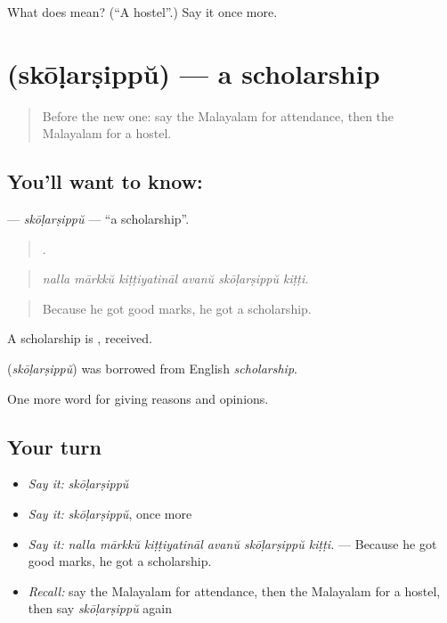 \begin{tcolorbox}[breakable,colback=teal!4,colframe=teal!35!black,title={Before you move on}]
What does  mean? (\textquotedblleft{}A hostel\textquotedblright{}.) Say it once more.
\end{tcolorbox}
\section[\texorpdfstring{\ml{സ്കോളർഷിപ്പ്} (skōḷarṣippŭ)}{സ്കോളർഷിപ്പ് (skōḷarṣippŭ)}]{ (skōḷarṣippŭ) — a scholarship}

\label{lesson:ML-C434-skolarsippu}



\begin{quote}
Before the new one: say the Malayalam for attendance, then the Malayalam for a hostel.
\end{quote}

\subsection*{You'll want to know: }
\textbf{} — \emph{skōḷarṣippŭ} — \textquotedblleft{}a scholarship\textquotedblright{}.

\begin{quote}
     .
\end{quote}

\begin{quote}
\emph{nalla mārkkŭ kiṭṭiyatināl avanŭ skōḷarṣippŭ kiṭṭi.}
\end{quote}

\begin{quote}
Because he got good marks, he got a scholarship.
\end{quote}

A scholarship is , received.

\begin{cousinweb}
\textbf{} (\emph{skōḷarṣippŭ}) was borrowed from English \emph{scholarship}.
\end{cousinweb}

\begin{grammarlens}[title={What you've built}]
One more word for giving reasons and opinions.
\end{grammarlens}

\subsection*{Your turn}
\begin{itemize}
\raggedright
  \item \emph{Say it:} \emph{skōḷarṣippŭ}
  \item \emph{Say it:} \emph{skōḷarṣippŭ}, once more
  \item \emph{Say it:} \emph{nalla mārkkŭ kiṭṭiyatināl avanŭ skōḷarṣippŭ kiṭṭi.} — Because he got good marks, he got a scholarship.
  \item \emph{Recall:} say the Malayalam for attendance, then the Malayalam for a hostel, then say \emph{skōḷarṣippŭ} again
\end{itemize}

